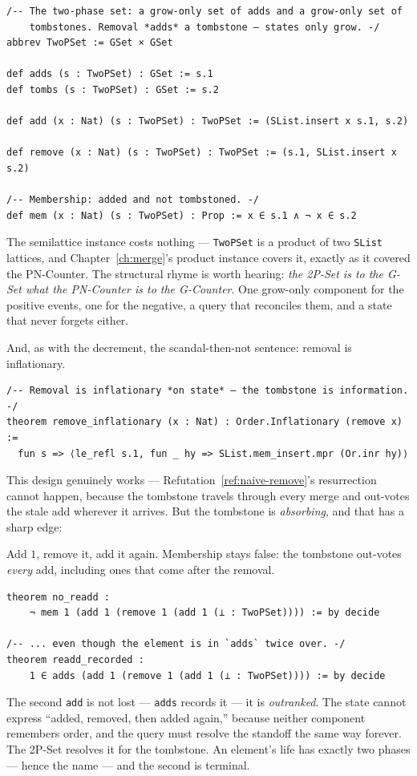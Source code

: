 \documentclass[12pt, a4paper, openright]{book}
\theoremstyle{thmstyle}
\theoremstyle{defstyle}
\newcommand{\lc}[1]{\texttt{#1}}
\newcounter{refutation}[chapter]
\renewcommand{\therefutation}{\thechapter.\arabic{refutation}}
\newenvironment{refutedbox}[1]{%
  \refstepcounter{refutation}%
  \begin{tcolorbox}[refutedbox,
    title={Refuted \therefutation\ --- #1}]%
}{\end{tcolorbox}}
\begin{document}
\begin{verbatim}
/-- The two-phase set: a grow-only set of adds and a grow-only set of
    tombstones. Removal *adds* a tombstone — states only grow. -/
abbrev TwoPSet := GSet × GSet

def adds (s : TwoPSet) : GSet := s.1
def tombs (s : TwoPSet) : GSet := s.2

def add (x : Nat) (s : TwoPSet) : TwoPSet := (SList.insert x s.1, s.2)

def remove (x : Nat) (s : TwoPSet) : TwoPSet := (s.1, SList.insert x s.2)

/-- Membership: added and not tombstoned. -/
def mem (x : Nat) (s : TwoPSet) : Prop := x ∈ s.1 ∧ ¬ x ∈ s.2
\end{verbatim}

The semilattice instance costs nothing --- \lc{TwoPSet} is a product of
two \lc{SList} lattices, and Chapter~\ref{ch:merge}'s product instance
covers it, exactly as it covered the PN-Counter. The structural rhyme is
worth hearing: \emph{the 2P-Set is to the G-Set what the PN-Counter is
to the G-Counter}. One grow-only component for the positive events, one
for the negative, a query that reconciles them, and a state that never
forgets either.

And, as with the decrement, the scandal-then-not sentence: removal is
inflationary.

\begin{verbatim}
/-- Removal is inflationary *on state* — the tombstone is information. -/
theorem remove_inflationary (x : Nat) : Order.Inflationary (remove x) :=
  fun s => ⟨le_refl s.1, fun _ hy => SList.mem_insert.mpr (Or.inr hy)⟩
\end{verbatim}

This design genuinely works --- Refutation~\ref{ref:naive-remove}'s
resurrection cannot happen, because the tombstone travels through every
merge and out-votes the stale add wherever it arrives. But the tombstone
is \emph{absorbing}, and that has a sharp edge:

\begin{refutedbox}{The 2P-Set supports re-adding}
  \label{ref:no-readd}
  Add $1$, remove it, add it again. Membership stays false: the
  tombstone out-votes \emph{every} add, including ones that come after
  the removal.
\begin{verbatim}
theorem no_readd :
    ¬ mem 1 (add 1 (remove 1 (add 1 (⊥ : TwoPSet)))) := by decide

/-- ... even though the element is in `adds` twice over. -/
theorem readd_recorded :
    1 ∈ adds (add 1 (remove 1 (add 1 (⊥ : TwoPSet)))) := by decide
\end{verbatim}
  The second \lc{add} is not lost --- \lc{adds} records it --- it is
  \emph{outranked}. The state cannot express ``added, removed, then
  added again,'' because neither component remembers order, and the
  query must resolve the standoff the same way forever. The 2P-Set
  resolves it for the tombstone. An element's life has exactly two
  phases --- hence the name --- and the second is terminal.
\end{refutedbox}
\end{document}
